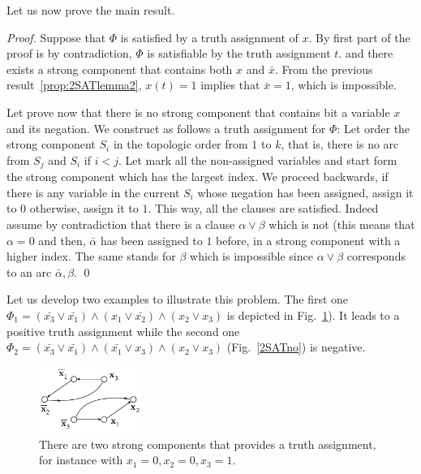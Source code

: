 Let us now prove the main result.

\begin{proof}
Suppose that $\Phi$ is satisfied by a truth assignment of $x$.  By
first part of the proof is by contradiction, $\Phi$ is satisfiable by
the truth assignment $t$.  and there exists a strong component that
contains both $x$ and $\bar{x}$.  From the previous
result~\ref{prop:2SATlemma2}, $x(t)=1$ implies that $\bar{x}=1$, which
is impossible.

Let prove now that there is no strong component that contains bit a
variable $x$ and its negation.  We construct as follows a truth
assignment for $\Phi$: Let order the strong component $S_i$ in the
topologic order from $1$ to $k$, that is, there is no arc from $S_j$
and $S_i$ if $i<j$.  Let mark all the non-assigned variables and start
form the strong component which has the largest index.  We proceed
backwards, if there is any variable in the current $S_i$ whose
negation has been assigned, assign it to $0$ otherwise, assign it to
$1$.  This way, all the clauses are satisfied.  Indeed assume by
contradiction that there is a clause $\alpha \vee \beta$ which is not
(this means that $\alpha = 0$ and then, $\bar{\alpha}$ has been
assigned to $1$ before, in a strong component with a higher index.
The same stands for $\beta$ which is impossible since $\alpha \vee
\beta$ corresponds to an arc $\bar{\alpha},\beta$.  \qed
\end{proof}


Let us develop two examples to illustrate this problem.  The first one
$\Phi_1 = (\bar{x_{3}} \vee \bar{x_{1}}) \wedge (x_{1} \vee
\bar{x_{2}}) \wedge (x_{2} \vee x_{3})$ is depicted in
Fig.~\ref{2SATyes}). It leads to a positive truth assignment while the
second one $\Phi_2 = (\bar{x_{3}} \vee \bar{x_{1}}) \wedge
(\bar{x_{1}} \vee {x_{3}}) \wedge (x_{2} \vee x_{3})$
(Fig.~\ref{2SATno}) is negative.


\begin{figure}[h]
\begin{center}
\includegraphics[width=0.3\textwidth]{FiguresGraph/2SATyes.png}
        \caption{There are two strong components that provides a truth assignment, for instance with $x_1=0, x_2=0, x_3=1$.}
\label{2SATyes}
\end{center}
\end{figure}

